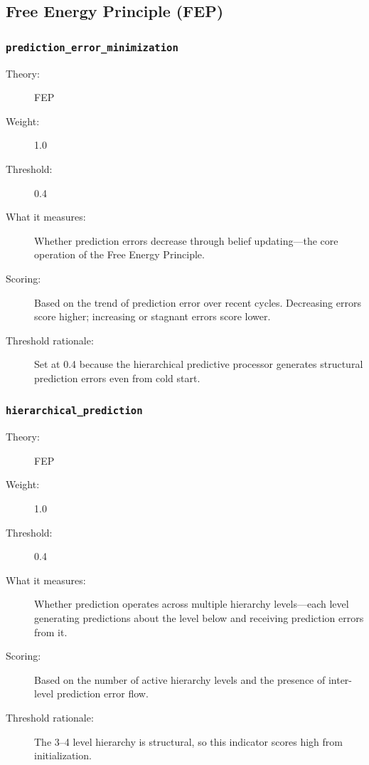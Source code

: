 \subsection{Free Energy Principle (FEP)}

\subsubsection{\texttt{prediction\_error\_minimization}}
\begin{description}
  \item[Theory:] FEP \cite{friston2010}
  \item[Weight:] 1.0
  \item[Threshold:] 0.4
  \item[What it measures:] Whether prediction errors decrease through belief updating---the core operation of the Free Energy Principle.
  \item[Scoring:] Based on the trend of prediction error over recent cycles. Decreasing errors score higher; increasing or stagnant errors score lower.
  \item[Threshold rationale:] Set at 0.4 because the hierarchical predictive processor generates structural prediction errors even from cold start.
\end{description}

\subsubsection{\texttt{hierarchical\_prediction}}
\begin{description}
  \item[Theory:] FEP
  \item[Weight:] 1.0
  \item[Threshold:] 0.4
  \item[What it measures:] Whether prediction operates across multiple hierarchy levels---each level generating predictions about the level below and receiving prediction errors from it.
  \item[Scoring:] Based on the number of active hierarchy levels and the presence of inter-level prediction error flow.
  \item[Threshold rationale:] The 3--4 level hierarchy is structural, so this indicator scores high from initialization.
\end{description}


